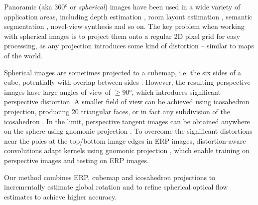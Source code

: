 Panoramic (aka 360° or \emph{spherical}) images have been used in a wide variety of application areas, including
depth estimation \cite{ImHRJCK2016, JiangSZDH2021, LaiXLL2019, SunSC2021, WangHCLYSCS2018, WangSTCS2020, WangYSCT2020, ZioulKZD2018, ZioulKZAD2019},
room layout estimation \cite{WangYSCT2021, Tran2021, EderMG2019, FernaFPDCG2020, JinXZZTXYG2020, SunSC2021, ZengKG2020},
semantic segmentation \cite{LeeJYJY2019, SunSC2021, YangZRHS2021, ZhangLSC2019},
novel-view synthesis \cite{BerteYLR2020, HuangCCJ2017, MatzeCEKS2017, XuZXTG2021} and so on.
The key problem when working with spherical images is to project them onto a regular 2D pixel grid for easy processing, as any projection introduces some kind of distortion – similar to maps of the world.


Spherical images are sometimes projected to a cubemap,
i.e. the six sides of a cube, potentially with overlap between sides \cite{ChengCDWLS2018, WangHCLYSCS2018, WangYSCT2020}.
However, the resulting perspective images have large angles of view of $\geq$90°, which introduces significant perspective distortion.
A smaller field of view can be achieved using icosahedron projection, producing 20 triangular faces, or in fact any subdivision of the icosahedron \citep{LuoZSX2019, ZhangLSC2019, LeeJYJY2019}.
In the limit, perspective tangent images can be obtained anywhere on the sphere using gnomonic projection \citep{CoorsCG2018, EderSLF2020}.
To overcome the significant distortions near the poles at the top/bottom image edges in ERP images, distortion-aware convolutions adapt kernels using gnomonic projection \cite{CoorsCG2018, SuG2019, TatenNT2018}, which enable training on perspective images and testing on ERP images.


Our method combines ERP, cubemap and icosahedron projections to incrementally estimate global rotation and to refine spherical optical flow estimates to achieve higher accuracy.







